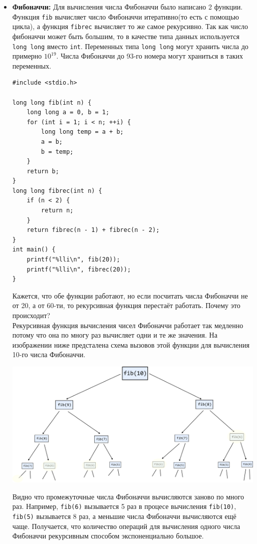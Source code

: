 \documentclass{article}
\begin{document}
\begin{itemize}
\item \textbf{Фибоначчи:}
Для вычисления числа Фибоначчи было написано 2 функции. Функция \texttt{fib} вычисляет число Фибоначчи итеративно(то есть с помощью цикла), а функция \texttt{fibrec} вычисляет то же самое рекурсивно. Так как число фибоначчи может быть большим, то в качестве типа данных используется \texttt{long long} вместо \texttt{int}. Переменных типа \texttt{long long} могут хранить числа до примерно $10^{19}$. Числа Фибоначчи до 93-го номера могут храниться в таких переменных.
\begin{lstlisting}
#include <stdio.h>

long long fib(int n) {
    long long a = 0, b = 1;
    for (int i = 1; i < n; ++i) {
        long long temp = a + b;
        a = b;
        b = temp;
    }
    return b;
}
long long fibrec(int n) {
    if (n < 2) {
        return n;
    }
    return fibrec(n - 1) + fibrec(n - 2);
}
int main() {
    printf("%lli\n", fib(20));
    printf("%lli\n", fibrec(20));
}
\end{lstlisting}
Кажется, что обе функции работают, но если посчитать числа Фибоначчи не от 20, а от 60-ти, то рекурсивная функция перестаёт работать. Почему это происходит? \\

Рекурсивная функция вычисления чисел Фибоначчи работает так медленно потому что она по многу раз вычисляет одни и те же значения. На изображении ниже предсталена схема вызовов этой функции для вычисления 10-го числа Фибоначчи.
\begin{center}
\includegraphics[scale=0.8]{../images/fib.png}
\end{center}
Видно что промежуточные числа Фибоначчи вычисляются заново по много раз. Например, \texttt{fib(6)} вызывается 5 раз в процесе вычисления \texttt{fib(10)}, \texttt{fib(5)} вызывается 8 раз, а меньшие числа Фибоначчи вычисляются ещё чаще. Получается, что количество операций для вычисления одного числа Фибоначчи рекурсивным способом экспоненциально большое.\\


\end{itemize}
\end{document}
